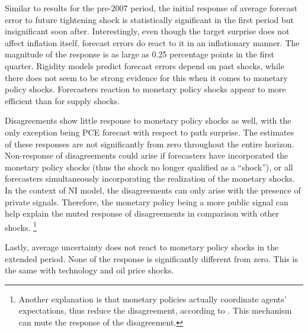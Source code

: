 \documentclass[12pt]{article}
\begin{document}
	Similar to results for the pre-2007 period, the initial response of average forecast error to future tightening shock is statistically significant in the first period but insignificant soon after.  Interestingly, even though the target surprise does not affect inflation itself, forecast errors do react to it in an inflationary manner. The magnitude of the response is as large as 0.25 percentage points in the first quarter. Rigidity models predict forecast errors depend on past shocks, while there does not seem to be strong evidence for this when it comes to monetary policy shocks. Forecasters reaction to monetary policy shocks appear to more efficient than for supply shocks. 
	
	Disagreements show little response to monetary policy shocks as well, with the only exception being PCE forecast with respect to path surprise. The estimates of these responses are not significantly from zero throughout the entire horizon. Non-response of disagreements could arise if forecasters have incorporated the monetary policy shocks (thus the shock no longer qualified as a ``shock''), or all forecasters simultaneously incorporating the realization of the monetary shocks. In the context of NI model, the disagreements can only arise with the presence of private signals. Therefore, the monetary policy being a more public signal can help explain the muted response of disagreements in comparison with other shocks. \footnote{Another explanation is that monetary policies actually coordinate agents' expectations, thus reduce the disagreement, according to \citet{morris2002social}. This mechanism can mute the response of the disagreement.}
	
	Lastly, average uncertainty does not react to monetary policy shocks in the extended period. None of the response is significantly different from zero. This is the same with technology and oil price shocks. 
	
\end{document}
